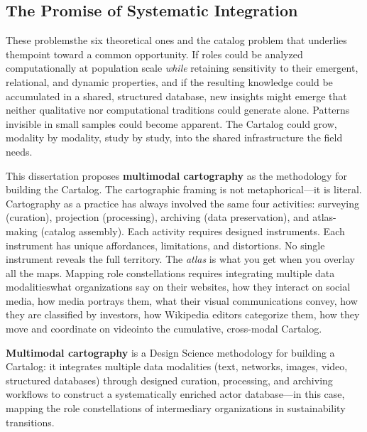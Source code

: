 \documentclass[../main.tex]{subfiles}
\begin{document}
\subsection{The Promise of Systematic Integration}

These problems\textemdash the six theoretical ones and the catalog problem that underlies them\textemdash point toward a common opportunity. If roles could be analyzed computationally at population scale \emph{while} retaining sensitivity to their emergent, relational, and dynamic properties, and if the resulting knowledge could be accumulated in a shared, structured database, new insights might emerge that neither qualitative nor computational traditions could generate alone. Patterns invisible in small samples could become apparent. The Cartalog could grow, modality by modality, study by study, into the shared infrastructure the field needs.

This dissertation proposes \textbf{multimodal cartography} as the methodology for building the Cartalog. The cartographic framing is not metaphorical---it is literal. Cartography as a practice has always involved the same four activities: surveying (curation), projection (processing), archiving (data preservation), and atlas-making (catalog assembly). Each activity requires designed instruments. Each instrument has unique affordances, limitations, and distortions. No single instrument reveals the full territory. The \emph{atlas} is what you get when you overlay all the maps. Mapping role constellations requires integrating multiple data modalities\textemdash what organizations say on their websites, how they interact on social media, how media portrays them, what their visual communications convey, how they are classified by investors, how Wikipedia editors categorize them, how they move and coordinate on video\textemdash into the cumulative, cross-modal Cartalog.

\begin{roledef}
\textbf{Multimodal cartography} is a Design Science methodology for building a Cartalog: it integrates multiple data modalities (text, networks, images, video, structured databases) through designed curation, processing, and archiving workflows to construct a systematically enriched actor database---in this case, mapping the role constellations of intermediary organizations in sustainability transitions.
\end{roledef}
\end{document}
